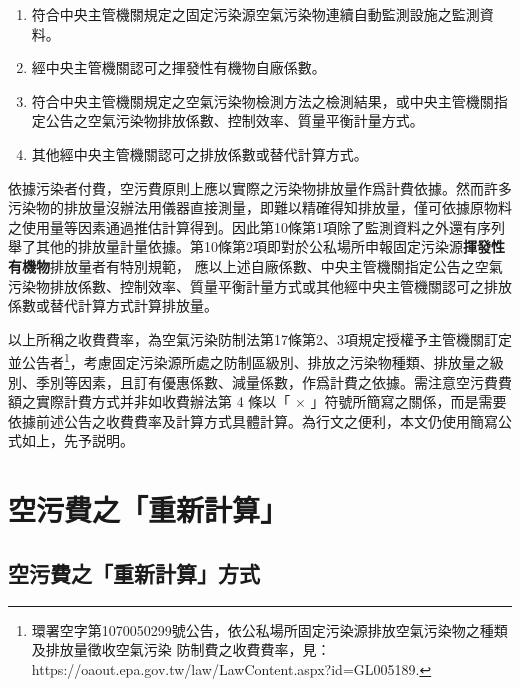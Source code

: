 \begin{enumerate}[itemsep=0em]
   \item 符合中央主管機關規定之固定污染源空氣污染物連續自動監測設施之監測資料。
   \item 經中央主管機關認可之揮發性有機物自廠係數。
   \item 符合中央主管機關規定之空氣污染物檢測方法之檢測結果，或中央主管機關指定公告之空氣污染物排放係數、控制效率、質量平衡計量方式。
   \item 其他經中央主管機關認可之排放係數或替代計算方式。
\end{enumerate}

依據污染者付費，空污費原則上應以實際之污染物排放量作爲計費依據。然而許多污染物的排放量沒辦法用儀器直接測量，即難以精確得知排放量，僅可依據原物料之使用量等因素通過推估計算得到。因此第10條第1項除了監測資料之外還有序列舉了其他的排放量計量依據。第10條第2項即對於公私場所申報固定污染源\textbf{揮發性有機物}排放量者有特別規範，
應以上述自廠係數、中央主管機關指定公告之空氣污染物排放係數、控制效率、質量平衡計量方式或其他經中央主管機關認可之排放係數或替代計算方式計算排放量。

以上所稱之收費費率，為空氣污染防制法第17條第2、3項規定授權予主管機關訂定並公告者\footnote{環署空字第1070050299號公告，依公私場所固定污染源排放空氣污染物之種類及排放量徵收空氣污染
防制費之收費費率，見：https://oaout.epa.gov.tw/law/LawContent.aspx?id=GL005189.}，考慮固定污染源所處之防制區級別、排放之污染物種類、排放量之級別、季別等因素，且訂有優惠係數、減量係數，作爲計費之依據。需注意空污費費額之實際計費方式并非如收費辦法第 4 條以「 $\times$ 」符號所簡寫之關係，而是需要依據前述公告之收費費率及計算方式具體計算。為行文之便利，本文仍使用簡寫公式如上，先予説明。

 
\section{空污費之「重新計算」}
\subsection{空污費之「重新計算」方式}

